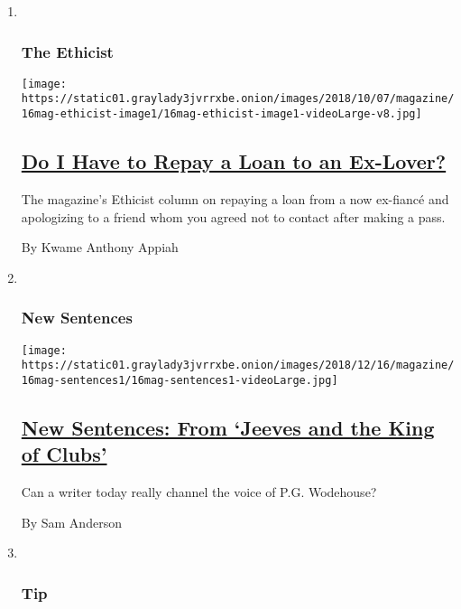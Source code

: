 \begin{enumerate}
\def\labelenumi{\arabic{enumi}.}
\item ~
  \hypertarget{the-ethicist}{%
  \subsubsection{The Ethicist}\label{the-ethicist}}

  \texttt{[image: https://static01.graylady3jvrrxbe.onion/images/2018/10/07/magazine/16mag-ethicist-image1/16mag-ethicist-image1-videoLarge-v8.jpg]}

  \hypertarget{do-i-have-to-repay-a-loan-to-an-ex-lover}{%
  \subsection{\texorpdfstring{\href{/2018/12/11/magazine/do-i-have-to-repay-a-loan-to-an-ex-lover.html}{Do
  I Have to Repay a Loan to an
  Ex-Lover?}}{Do I Have to Repay a Loan to an Ex-Lover?}}\label{do-i-have-to-repay-a-loan-to-an-ex-lover}}

  The magazine's Ethicist column on repaying a loan from a now ex-fiancé
  and apologizing to a friend whom you agreed not to contact after
  making a pass.

  By Kwame Anthony Appiah
\item ~
  \hypertarget{new-sentences}{%
  \subsubsection{New Sentences}\label{new-sentences}}

  \texttt{[image: https://static01.graylady3jvrrxbe.onion/images/2018/12/16/magazine/16mag-sentences1/16mag-sentences1-videoLarge.jpg]}

  \hypertarget{new-sentences-from-jeeves-and-the-king-of-clubs}{%
  \subsection{\texorpdfstring{\href{/2018/12/13/magazine/new-sentences-from-jeeves-and-the-king-of-clubs.html}{New
  Sentences: From `Jeeves and the King of
  Clubs'}}{New Sentences: From `Jeeves and the King of Clubs'}}\label{new-sentences-from-jeeves-and-the-king-of-clubs}}

  Can a writer today really channel the voice of P.G. Wodehouse?

  By Sam Anderson
\item ~
  \hypertarget{tip}{%
  \subsubsection{Tip}\label{tip}}


\end{enumerate}
